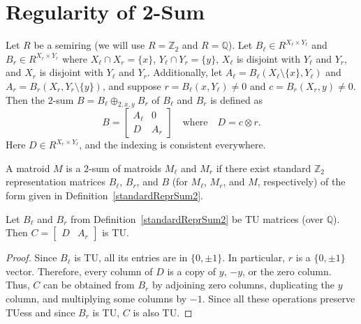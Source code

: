 \section{Regularity of 2-Sum}

\begin{definition}
    \label{standardReprSum2}
    \leanok
    Let $R$ be a semiring (we will use $R = \mathbb{Z}_{2}$ and $R = \mathbb{Q}$). Let $B_{\ell} \in R^{X_{\ell} \times Y_{\ell}}$ and $B_{r} \in R^{X_{r} \times Y_{r}}$ where $X_{\ell} \cap X_{r} = \{x\}$, $Y_{\ell} \cap Y_{r} = \{y\}$, $X_{\ell}$ is disjoint with $Y_{\ell}$ and $Y_{r}$, and $X_{r}$ is disjoint with $Y_{\ell}$ and $Y_{r}$. Additionally, let $A_{\ell} = B_{\ell} (X_{\ell} \setminus \{x\}, Y_{\ell})$ and $A_{r} = B_{r} (X_{r}, Y_{r} \setminus \{y\})$, and suppose $r = B_{\ell} (x, Y_{\ell}) \neq 0$ and $c = B_{r} (X_{r}, y) \neq 0$. Then the $2$-sum $B = B_{\ell} \oplus_{2, x, y} B_{r}$ of $B_{\ell}$ and $B_{r}$ is defined as
    \[
        B = \begin{bmatrix} A_{\ell} & 0 \\ D & A_{r} \end{bmatrix}
        \quad \text{where} \quad
        D = c \otimes r.
    \]
    Here $D \in R^{X_{r} \times Y_{\ell}}$, and the indexing is consistent everywhere.
\end{definition}

\begin{definition}
    \label{Matroid.IsSum2of}
    \leanok
    A matroid $M$ is a $2$-sum of matroids $M_{\ell}$ and $M_{r}$ if there exist standard $\mathbb{Z}_{2}$ representation matrices $B_{\ell}$, $B_{r}$, and $B$ (for $M_{\ell}$, $M_{r}$, and $M$, respectively) of the form given in Definition~\ref{standardReprSum2}.
\end{definition}

\begin{lemma}
    \label{Matrix.IsTotallyUnimodular.fromCols_outer}
    \leanok
    Let $B_{\ell}$ and $B_{r}$ from Definition~\ref{standardReprSum2} be TU matrices (over $\mathbb{Q}$). Then $C = \begin{bmatrix} D & A_{r} \end{bmatrix}$ is TU.
\end{lemma}

\begin{proof}
    \leanok
    Since $B_{\ell}$ is TU, all its entries are in $\{0, \pm 1\}$. In particular, $r$ is a $\{0, \pm 1\}$ vector. Therefore, every column of $D$ is a copy of $y$, $-y$, or the zero column. Thus, $C$ can be obtained from $B_{r}$ by adjoining zero columns, duplicating the $y$ column, and multiplying some columns by $-1$. Since all these operations preserve TUess and since $B_{r}$ is TU, $C$ is also TU.
\end{proof}

